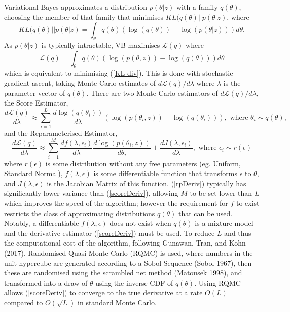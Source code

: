 \documentclass[12pt,a4paper]{article}\usepackage[]{graphicx}\usepackage[]{color}
\begin{document}
Variational Bayes approximates a distribution $p(\theta | z)$ with a family $q(\theta)$, choosing the member of that family that minimises $KL(q(\theta) || p(\theta | z)$, where
\begin{equation}
\label{KL-div}
KL(q(\theta) || p(\theta | z) = \int_{\theta} q(\theta) \left(\log(q(\theta)) - \log(p(\theta | z))\right) d\theta.
\end{equation}
As $p(\theta | z)$ is typically intractable, VB maximises $\mathcal{L}(q)$ where
\begin{equation}
\label{ELBO}
\mathcal{L}(q) = \int_{\theta} q(\theta) \left(\log(p(\theta, z)) - \log(q(\theta))\right) d\theta
\end{equation}
which is equivalent to minimising (\ref{KL-div}).
This is done with stochastic gradient ascent, taking Monte Carlo estimates of $d\mathcal{L}(q) / d \lambda$ where $\lambda$ is the parameter vector of $q(\theta)$.
There are two Monte Carlo estimators of $d\mathcal{L}(q) / d \lambda$, the Score Estimator, 
\begin{equation}
\label{scoreDeriv}
\frac{d\mathcal{L}(q)}{d \lambda} \approx \sum_{i = 1}^L \frac{d \log(q(\theta_i))}{d \lambda} \left(\log(p(\theta_i, z)) - \log(q(\theta_i)) \right), \mbox{ where } \theta_i \sim q(\theta),
\end{equation}
and the Reparameterised Estimator,
\begin{equation}
\label{rpDeriv}
\frac{d\mathcal{L}(q)}{d \lambda} \approx \sum_{i = 1}^M \frac{d f(\lambda, \epsilon_i)}{d \lambda} \frac{d \log(p(\theta_i, z))}{d \theta_i} + \frac{d J(\lambda, \epsilon_i)}{d \lambda}, \mbox{ where } \epsilon_i \sim r(\epsilon)
\end{equation}
where $r(\epsilon)$ is some distribution without any free parameters (eg. Uniform, Standard Normal), $f(\lambda, \epsilon)$ is some differentiable function that transforms $\epsilon$ to $\theta$, and $J(\lambda, \epsilon)$ is the Jacobian Matrix of this function. (\ref{rpDeriv}) typically has significantly lower variance than (\ref{scoreDeriv}), allowing $M$ to be set lower than $L$ which improves the speed of the algorithm; however the requirement for $f$ to exist restricts the class of approximating distributions $q(\theta)$ that can be used.
Notably, a differentiable $f(\lambda, \epsilon)$ does not exist when $q(\theta)$ is a mixture model and the derivative estimator (\ref{scoreDeriv}) must be used. To reduce $L$ and thus the computational cost of the algorithm, following Gunawan, Tran, and Kohn (2017), Randomised Quasi Monte Carlo (RQMC) is used, where numbers in the unit hypercube are generated according to a Sobol Sequence (Sobol 1967), then these are randomised using the scrambled net method (Matousek 1998), and transformed into a draw of $\theta$ using the inverse-CDF of $q(\theta)$. Using RQMC allows (\ref{scoreDeriv}) to converge to the true derivative at a rate $O(L)$ compared to $O(\sqrt{L})$ in standard Monte Carlo. 
\end{document}
